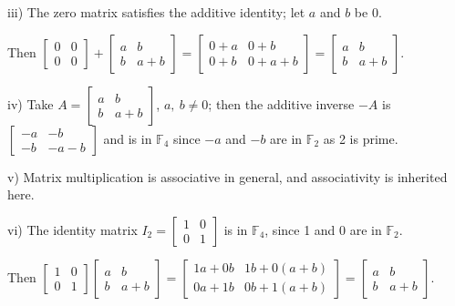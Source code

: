 \documentclass{amsart}
\begin{document}
	iii) The zero matrix satisfies the additive identity; let $a$ and $b$ be 0. 
	
	Then $\begin{bmatrix}
	0 & 0 \\
	0 & 0
	\end{bmatrix} + \begin{bmatrix}
	a & b \\
	b & a+b
	\end{bmatrix} =
	\begin{bmatrix}
	0+a & 0+b \\
	0+b & 0+a+b
	\end{bmatrix} = \begin{bmatrix}
	a & b \\
	b & a+b
	\end{bmatrix}.$
	
	iv) Take $A = \begin{bmatrix}
	a & b \\
	b & a+b
	\end{bmatrix}$, $a,\ b \neq 0$; then the additive inverse $-A$ is $\begin{bmatrix}
	-a & -b \\
	-b & -a-b
	\end{bmatrix}$ and is in $\mathbb{F}_4$ since $-a$ and $-b$ are in $\mathbb{F}_2$ as 2 is prime.
	
	v) Matrix multiplication is associative in general, and associativity is inherited here.
	
	vi) The identity matrix $I_2 = \begin{bmatrix}
	1 & 0 \\
	0 & 1
	\end{bmatrix}$ is in $\mathbb{F}_4$, since 1 and 0 are in $\mathbb{F}_2$.
	
	Then $\begin{bmatrix}
	1 & 0 \\
	0 & 1
	\end{bmatrix} \begin{bmatrix}
	a & b \\
	b & a+b
	\end{bmatrix} =
	\begin{bmatrix}
	1a+0b & 1b+0(a+b) \\
	0a+1b & 0b+1(a+b)
	\end{bmatrix} =\begin{bmatrix}
	a & b \\
	b & a+b
	\end{bmatrix}.$
	
\end{document}
